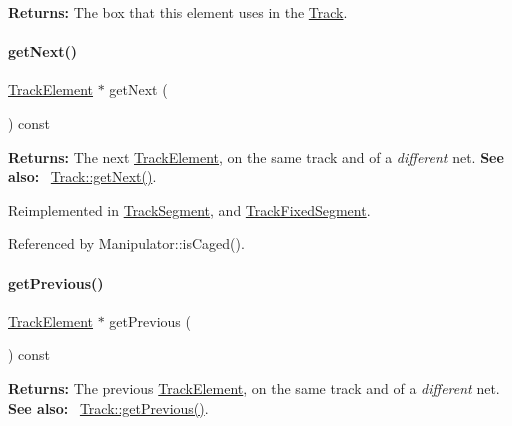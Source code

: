 {\bfseries Returns\+:} The box that this element uses in the \mbox{\hyperlink{classKite_1_1Track}{Track}}. \mbox{\label{classKite_1_1TrackElement_a010b7fc8801c5b88aefa4137cf85186d}} 
\paragraph{\texorpdfstring{get\+Next()}{getNext()}}
{\footnotesize\ttfamily \mbox{\hyperlink{classKite_1_1TrackElement}{Track\+Element}} $\ast$ get\+Next (\begin{DoxyParamCaption}{ }\end{DoxyParamCaption}) const\hspace{0.3cm}{\ttfamily [virtual]}}

{\bfseries Returns\+:} The next \mbox{\hyperlink{classKite_1_1TrackElement}{Track\+Element}}, on the same track and of a {\itshape different} net. {\bfseries See also\+:}~ \mbox{\hyperlink{classKite_1_1Track_af3db59591bef3c690ace92c114a4e4aa}{Track\+::get\+Next()}}. 

Reimplemented in \mbox{\hyperlink{classKite_1_1TrackSegment_a010b7fc8801c5b88aefa4137cf85186d}{Track\+Segment}}, and \mbox{\hyperlink{classKite_1_1TrackFixedSegment_a010b7fc8801c5b88aefa4137cf85186d}{Track\+Fixed\+Segment}}.



Referenced by Manipulator\+::is\+Caged().

\mbox{\label{classKite_1_1TrackElement_a55d6115d84c11ad147f4c38fe372ea24}} 
\paragraph{\texorpdfstring{get\+Previous()}{getPrevious()}}
{\footnotesize\ttfamily \mbox{\hyperlink{classKite_1_1TrackElement}{Track\+Element}} $\ast$ get\+Previous (\begin{DoxyParamCaption}{ }\end{DoxyParamCaption}) const\hspace{0.3cm}{\ttfamily [virtual]}}

{\bfseries Returns\+:} The previous \mbox{\hyperlink{classKite_1_1TrackElement}{Track\+Element}}, on the same track and of a {\itshape different} net. {\bfseries See also\+:}~ \mbox{\hyperlink{classKite_1_1Track_a290fcfe6131730d216951a3b5207d777}{Track\+::get\+Previous()}}. 

